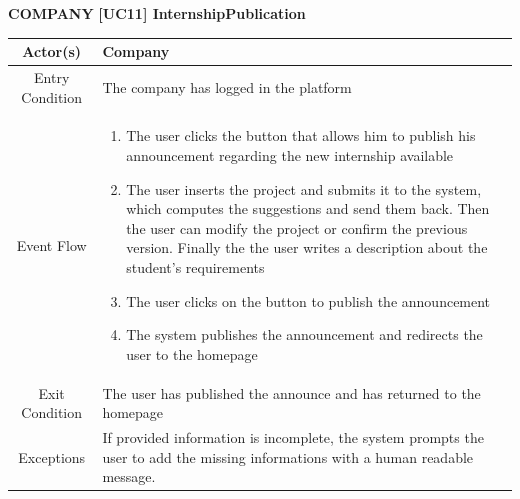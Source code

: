 \documentclass{article}
\begin{document}
\textbf{COMPANY}\newline\newline
\vspace{1cm}
\textbf{[UC11] InternshipPublication}

\begin{table}[H]
    \centering
    \begin{tabular}{|c|p{10cm}|}
    \hline
        Actor(s)  & Company\\ 
    \hline
        Entry Condition &  
        The company has logged in the platform \\
    \hline
        Event Flow &
        \begin{enumerate}
            \item The user clicks the button that allows him to publish his announcement regarding the new internship available 
            \item The user inserts the project and submits it to the system, which computes the suggestions and send them back. Then the user can modify the project or confirm the previous version. Finally the the user writes a description about the student's requirements
            \item The user clicks on the button to publish the announcement
            \item The system publishes the announcement and redirects the user to the homepage
        \end{enumerate}
         \\
    \hline
        Exit Condition & The user has published the announce and has returned to the homepage \\
    \hline
        Exceptions &  If provided information is incomplete, the system prompts the user to add the missing informations with a human readable message.\\
    \hline
    \end{tabular}
    \label{tab:my_label}
\end{table}
\end{document}
